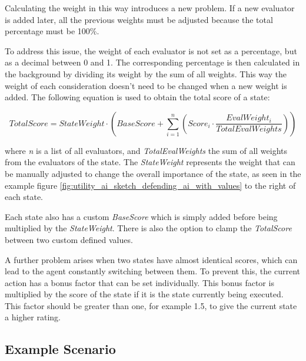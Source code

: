 Calculating the weight in this way introduces a new problem. If a new evaluator is added later, all the previous weights must be adjusted because the total percentage must be 100\%.

To address this issue, the weight of each evaluator is not set as a percentage, but as a decimal between 0 and 1. The corresponding percentage is then calculated in the background by dividing its weight by the sum of all weights. This way the weight of each consideration doesn't need to be changed when a new weight is added. The following equation is used to obtain the total score of a state:

\begin{equation}
TotalScore = StateWeight \cdot (BaseScore + \sum_{i=1}^{n} \left( Score_i \cdot \frac{EvalWeight_i}{TotalEvalWeights} \right))
\end{equation}

where \textit{n} is a list of all evaluators, and \textit{TotalEvalWeights} the sum of all weights from the evaluators of the state. The \textit{StateWeight} represents the weight that can be manually adjusted to change the overall importance of the state, as seen in the example figure \ref{fig:utility_ai_sketch_defending_ai_with_values} to the right of each state.

Each state also has a custom \textit{BaseScore} which is simply added before being multiplied by the \textit{StateWeight}. There is also the option to clamp the \textit{TotalScore} between two custom defined values.

A further problem arises when two states have almost identical scores, which can lead to the agent constantly switching between them. To prevent this, the current action has a bonus factor that can be set individually. This bonus factor is multiplied by the score of the state if it is the state currently being executed. This factor should be greater than one, for example 1.5, to give the current state a higher rating.

\subsection{Example Scenario}
\label{subsec:utilityai_howitworks_generalprinciple}

